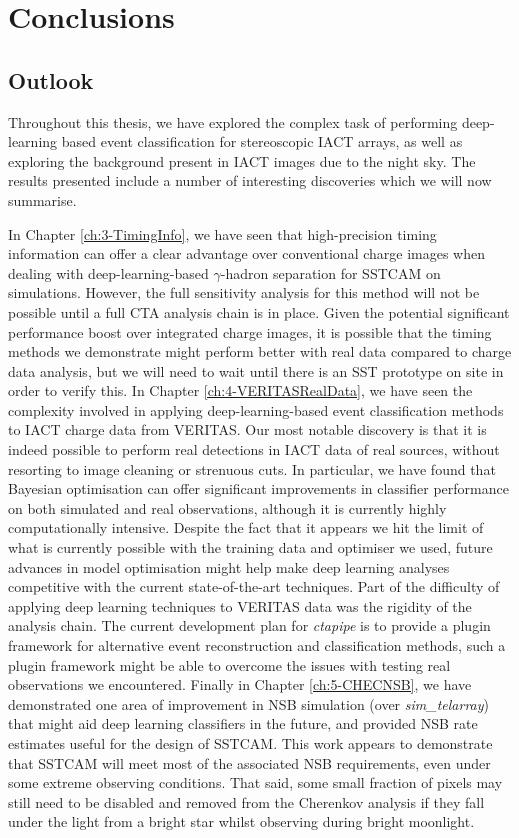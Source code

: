 \chapter{\label{ch6-Conclusions} Conclusions}
\minitoc
\section{Outlook}
Throughout this thesis, we have explored the complex task of performing deep-learning based event classification for stereoscopic IACT arrays, as well as exploring the background present in IACT images due to the night sky. The results presented include a number of interesting discoveries which we will now summarise.

In Chapter \ref{ch:3-TimingInfo}, we have seen that high-precision timing information can offer a clear advantage over conventional charge images when dealing with deep-learning-based $\gamma$-hadron separation for SSTCAM on simulations. However, the full sensitivity analysis for this method will not be possible until a full CTA analysis chain is in place. Given the potential significant performance boost over integrated charge images, it is possible that the timing methods we demonstrate might perform better with real data compared to charge data analysis, but we will need to wait until there is an SST prototype on site in order to verify this. In Chapter \ref{ch:4-VERITASRealData}, we have seen the complexity involved in applying deep-learning-based event classification methods to IACT charge data from VERITAS. Our most notable discovery is that it is indeed possible to perform real detections in IACT data of real sources, without resorting to image cleaning or strenuous cuts. In particular, we have found that Bayesian optimisation can offer significant improvements in classifier performance on both simulated and real observations, although it is currently highly computationally intensive. Despite the fact that it appears we hit the limit of what is currently possible with the training data and optimiser we used, future advances in model optimisation might help make deep learning analyses competitive with the current state-of-the-art techniques. Part of the difficulty of applying deep learning techniques to VERITAS data was the rigidity of the analysis chain. The current development plan for \textit{ctapipe} is to provide a plugin framework for alternative event reconstruction and classification methods, such a plugin framework might be able to overcome the issues with testing real observations we encountered. Finally in Chapter \ref{ch:5-CHECNSB}, we have demonstrated one area of improvement in NSB simulation (over \textit{sim\_telarray}) that might aid deep learning classifiers in the future, and provided NSB rate estimates useful for the design of SSTCAM. This work appears to demonstrate that SSTCAM will meet most of the associated NSB requirements, even under some extreme observing conditions. That said, some small fraction of pixels may still need to be disabled and removed from the Cherenkov analysis if they fall under the light from a bright star whilst observing during bright moonlight.

